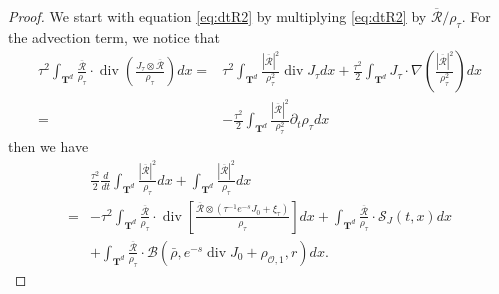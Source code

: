 \documentclass[english]{amsart}
\theoremstyle{plain}
\theoremstyle{definition}
\theoremstyle{remark}
\theoremstyle{plain}
\theoremstyle{plain}
\theoremstyle{plain}
\def\T{{\mathbf T}}%
\def\d{{\partial}}
\DeclareMathOperator{\diver}{div}
\numberwithin{equation}{section}
\begin{document}
\begin{proof}

We start with equation \eqref{eq:dtR2} by multiplying \eqref{eq:dtR2} by $\overline{\mathcal{R}}/\rho_\tau$. For the advection term, we notice that
\begin{align*}
\tau^2\int_{\T^d} \frac{\overline{\mathcal{R}}}{\rho_\tau}\cdot\diver\left(\frac{J_\tau\otimes\overline{\mathcal{R}}}{\rho_\tau}\right)dx=&\tau^2\int_{\T^d} \frac{|\overline{\mathcal{R}}|^2}{\rho_\tau^2}\diver J_\tau dx+\frac{\tau^2}{2}\int_{\T^d} J_\tau\cdot\nabla\left(\frac{|\overline{\mathcal{R}}|^2}{\rho_\tau^2}\right)dx\\
=&-\frac{\tau^2}{2}\int_{\T^d} \frac{|\overline{\mathcal{R}}|^2}{\rho_\tau^2}\d_t\rho_\tau dx
\end{align*}
then we have
\begin{align*}
&\frac{\tau^2}{2}\frac{d}{dt}\int_{\T^d} \frac{|\overline{\mathcal{R}}|^2}{\rho_\tau}dx+\int_{\T^d} \frac{|\overline{\mathcal{R}}|^2}{\rho_\tau}dx\\
=&-\tau^2\int_{\T^d} \frac{\overline{\mathcal{R}}}{\rho_\tau}\cdot\diver\left[\frac{\overline{\mathcal{R}}\otimes(\tau^{-1}e^{-s}J_0+\xi_\tau)}{\rho_\tau}\right]dx+\int_{\T^d} \frac{\overline{\mathcal{R}}}{\rho_\tau}\cdot\mathcal{S}_J(t,x)dx\\
&+\int_{\T^d} \frac{\overline{\mathcal{R}}}{\rho_\tau}\cdot\mathcal{B}(\bar\rho,e^{-s}\diver J_0+\rho_{\mathcal{O},1},r)dx.
\end{align*}



\end{proof}
\end{document}
